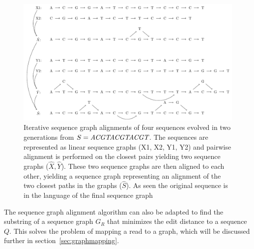 \begin{figure}
  \includegraphics[width=\textwidth]{figures/graph_msa}

  \caption{
    Iterative sequence graph alignments of four sequences evolved in two generations from $S=\emph{ACGTACGTACGT}$.
    The sequences are represented as linear sequence graphs (X1, X2, Y1, Y2) and pairwise alignment is performed on the closest pairs yielding two sequence graphs ($\hat{X}, \hat{Y}$).
    These two sequence graphs are then aligned to each other, yielding a sequence graph representing an alignment of the two closest paths in the graphs ($\hat{S}$).
    As seen the original sequence is in the language of the final sequence graph}
  \label{fig:treealign}
\end{figure}

The sequence graph alignment algorithm can also be adapted to find the substring of a sequence graph $G_R$ that minimizes the edit distance to a sequence $Q$.
This solves the problem of mapping a read to a graph, which will be discussed further in section~\ref{sec:graphmapping}.


